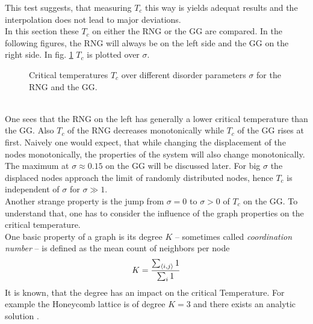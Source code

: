     This test suggests, that measuring \(T_c\) this way is yields
    adequat results and the interpolation does not lead to major
    deviations.\\
    In this section these \(T_c\) on either the RNG or the GG are
    compared. In the following figures, the RNG will always be on the
    left side and the GG on the right side.
    In fig. \ref{fig:Tc} \(T_c\) is plotted over \(\sigma\).
    \begin{figure}[htbp]
        \centering
        \caption[Critical Temperature over Different Disorder Parameters]
        {
            Critical temperatures \(T_c\) over different
            disorder parameters \(\sigma\) for
             the RNG and
             the GG.\\
        }
        \label{fig:Tc}
    \end{figure}\\
    One sees that the RNG on the left has generally a lower critical
    temperature than the GG. Also \(T_c\) of the RNG decreases
    monotonically while \(T_c\) of the GG rises at first. Naively one would
    expect, that while changing the displacement of the nodes monotonically,
    the properties of the system will also change monotonically. The
    maximum at \(\sigma \approx 0.15\) on the GG will be discussed later.
    For big \(\sigma\) the displaced nodes approach the limit of randomly
    distributed nodes, hence \(T_c\) is independent of \(\sigma\) for
    \(\sigma \gg 1\).\\
    Another strange property is the jump from \(\sigma = 0\) to \(\sigma > 0\)
    of \(T_c\) on the GG. To understand that, one has to
    consider the influence of the graph properties on the critical
    temperature.\\
    One basic property of a graph is its degree \(K\) -- sometimes
    called \emph{coordination number} -- is defined as the mean count of
    neighbors per node
    \begin{equation}
        K = \frac{\sum_{\left< i,j \right>} 1}{\sum_{i} 1}
        \label{eq:degree}
    \end{equation}
    It is known, that the degree has an impact on the critical Temperature.
    For example the Honeycomb lattice is of degree \(K=3\)
    and there exists an analytic solution \cite{Wannier1945}.
